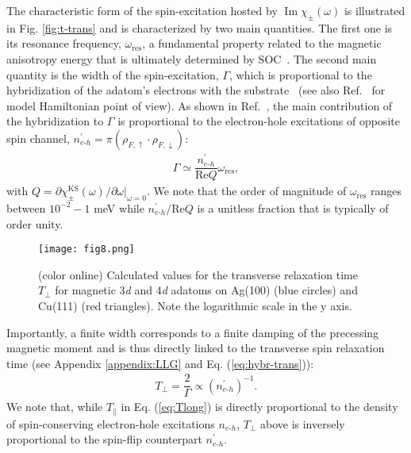 \documentclass[prb,footinbib,showpacs,twocolumn,amsmath,amssymb]{revtex4}
\renewcommand\Im{\operatorname{Im}}
\newcommand{\bek}{\begin{eqnarray}}
\newcommand{\ek}{\end{eqnarray}}
\begin{document}
The characteristic form of the spin-excitation hosted by $\Im\chi_{\pm}(\omega)$ is 
illustrated in Fig. \ref{fig:t-trans} and
is characterized  by two main quantities. The first one is
its resonance frequency, $\omega_{\text{res}}$, 
a fundamental property related to the magnetic anisotropy energy that is
ultimately determined by SOC~\cite{dias_relativistic_2015}.
The second main quantity is the width of the spin-excitation, $\Gamma$, 
which is  proportional to the hybridization of the adatom's electrons with 
the substrate~\cite{lounis_dynamical_2010,lounis_theory_2011}
(see also Ref.~ for 
model Hamiltonian point of view).
As shown in Ref.~,
the main contribution of the hybridization to $\Gamma$ is proportional
to the electron-hole excitations of opposite spin channel, 
$n_{e\text{-}h}^{\prime} = \pi(\rho_{F,\uparrow}\cdot\rho_{F,\downarrow})$:
\bek\label{eq:hybr-trans}
\Gamma\simeq \dfrac{n_{e\text{-}h}^{\prime}}{\text{Re}Q}  \omega_{\text{res}},
\ek
with $Q=\partial\chi^{\text{KS}}_{\pm}(\omega)/\partial\omega\Big|_{\omega=0}$. 
We note that the order of magnitude of $\omega_{\text{res}}$ ranges between 
$10^{-2}-1$ meV while
$n_{e\text{-}h}^{\prime}/\text{Re}Q$ is a unitless fraction that is typically of order 
unity.


\begin{figure}[t]
\texttt{[image: fig8.png]}
\caption{(color online) Calculated values for the transverse 
relaxation time $T_{\perp}$ for magnetic 3\textit{d} and 4\textit{d} 
    adatoms on Ag(100) (blue circles) and Cu(111) (red triangles). 
    Note the logarithmic scale in the y axis.
}
\label{fig:Tperp}
\end{figure}



Importantly, a finite width corresponds to a finite 
damping of the precessing magnetic moment 
and is thus directly linked to
the transverse spin relaxation time (see Appendix \ref{appendix:LLG}
and Eq. (\ref{eq:hybr-trans})): 
\bek\label{eq:Tperp-Gamma}
T_{\perp}=\dfrac{2}{\Gamma}\propto \left(n_{e\text{-}h}^{\prime}\right)^{-1}.
\ek
We note that, while $T_{\parallel}$ in Eq. (\ref{eq:Tlong})
is directly proportional to the density of 
spin-conserving electron-hole excitations $n_{e\text{-}h}$,
$T_{\perp}$ above is inversely proportional to the 
spin-flip counterpart $n_{e\text{-}h}^{\prime}$.
\end{document}
